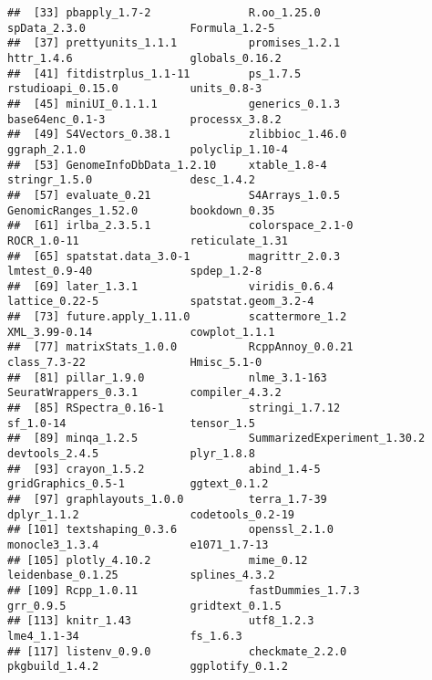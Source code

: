 \documentclass[
]{article}
\begin{document}
\begin{verbatim}
##  [33] pbapply_1.7-2               R.oo_1.25.0                 spData_2.3.0                Formula_1.2-5              
##  [37] prettyunits_1.1.1           promises_1.2.1              httr_1.4.6                  globals_0.16.2             
##  [41] fitdistrplus_1.1-11         ps_1.7.5                    rstudioapi_0.15.0           units_0.8-3                
##  [45] miniUI_0.1.1.1              generics_0.1.3              base64enc_0.1-3             processx_3.8.2             
##  [49] S4Vectors_0.38.1            zlibbioc_1.46.0             ggraph_2.1.0                polyclip_1.10-4            
##  [53] GenomeInfoDbData_1.2.10     xtable_1.8-4                stringr_1.5.0               desc_1.4.2                 
##  [57] evaluate_0.21               S4Arrays_1.0.5              GenomicRanges_1.52.0        bookdown_0.35              
##  [61] irlba_2.3.5.1               colorspace_2.1-0            ROCR_1.0-11                 reticulate_1.31            
##  [65] spatstat.data_3.0-1         magrittr_2.0.3              lmtest_0.9-40               spdep_1.2-8                
##  [69] later_1.3.1                 viridis_0.6.4               lattice_0.22-5              spatstat.geom_3.2-4        
##  [73] future.apply_1.11.0         scattermore_1.2             XML_3.99-0.14               cowplot_1.1.1              
##  [77] matrixStats_1.0.0           RcppAnnoy_0.0.21            class_7.3-22                Hmisc_5.1-0                
##  [81] pillar_1.9.0                nlme_3.1-163                SeuratWrappers_0.3.1        compiler_4.3.2             
##  [85] RSpectra_0.16-1             stringi_1.7.12              sf_1.0-14                   tensor_1.5                 
##  [89] minqa_1.2.5                 SummarizedExperiment_1.30.2 devtools_2.4.5              plyr_1.8.8                 
##  [93] crayon_1.5.2                abind_1.4-5                 gridGraphics_0.5-1          ggtext_0.1.2               
##  [97] graphlayouts_1.0.0          terra_1.7-39                dplyr_1.1.2                 codetools_0.2-19           
## [101] textshaping_0.3.6           openssl_2.1.0               monocle3_1.3.4              e1071_1.7-13               
## [105] plotly_4.10.2               mime_0.12                   leidenbase_0.1.25           splines_4.3.2              
## [109] Rcpp_1.0.11                 fastDummies_1.7.3           grr_0.9.5                   gridtext_0.1.5             
## [113] knitr_1.43                  utf8_1.2.3                  lme4_1.1-34                 fs_1.6.3                   
## [117] listenv_0.9.0               checkmate_2.2.0             pkgbuild_1.4.2              ggplotify_0.1.2            

\end{verbatim}
\end{document}
